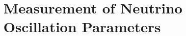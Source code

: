 \chapter{Measurement of Neutrino Oscillation Parameters}
\setchapterpreamble[u]{\margintoc}









